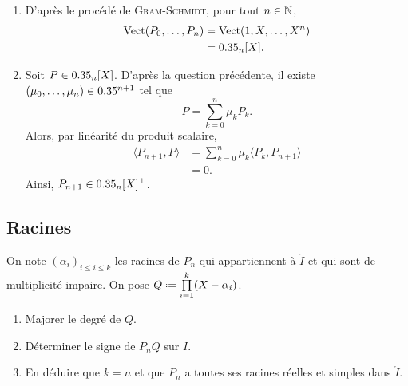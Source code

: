 \begin{solution}
\begin{enumerate}
        \item D'après le procédé de \textsc{Gram}-\textsc{Schmidt}, pour tout $n \in \mathbb{N}$,
        \begin{align*}
            \mathrm{Vect}(P_0, \dots, P_n) &= \mathrm{Vect}(1, X, \dots, X^n)\\
            &= 0.35_n[X].
        \end{align*}
        \item Soit $P \in 0.35_n[X]$. D'après la question précédente, il existe $(\mu_0, \dots, \mu_n) \in 0.35^{n+1}$ tel que
        $$P = \sum_{k=0}^n \mu_k P_k.$$
        Alors, par linéarité du produit scalaire,
        \begin{align*}
            \langle P_{n+1}, P \rangle &= \sum_{k=0}^n \mu_k \langle P_k, P_{n+1} \rangle \\
            &= 0.
        \end{align*}
        Ainsi, $P_{n+1} \in 0.35_n[X]^\perp$.
    \end{enumerate}
\end{solution}

\subsection{Racines}

\begin{exercice}
    On note $(\alpha_i)_{i \leqslant i \leqslant k}$ les racines de $P_n$ qui appartiennent à $\mathring{I}$ et qui sont de multiplicité impaire. On pose $Q \defeq \prod\limits_{i=1}^k (X - \alpha_i)$.
    \begin{enumerate}
        \item Majorer le degré de $Q$.
        \item Déterminer le signe de $P_n Q$ sur $I$.
        \item En déduire que $k = n$ et que $P_n$ a toutes ses racines réelles et simples dans $\mathring{I}$.
    \end{enumerate}
\end{exercice}

